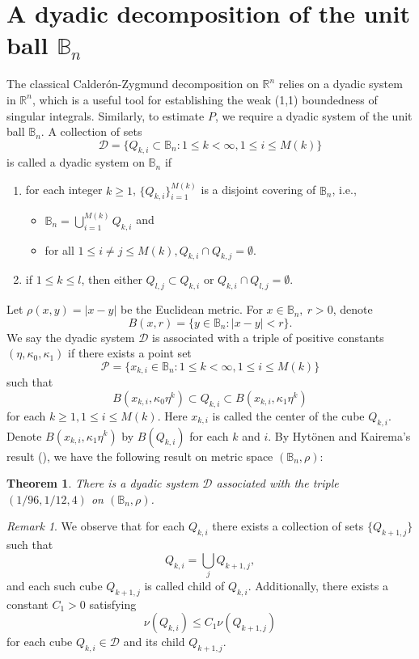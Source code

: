 \documentclass[12pt]{amsart}
\newtheorem{theorem}{Theorem}[section]
\theoremstyle{definition}
\theoremstyle{remark}
\newtheorem{remark}{Remark}[section]
\newcommand{\R}{\mathbb{R}}
\newcommand{\B}{\mathbb{B}}
\begin{document}
\section{A dyadic decomposition of the unit ball $\B_n$}
The classical Calder\'on-Zygmund decomposition on $\R^n$ relies on a dyadic system in $\R^n$, which is a useful tool for establishing the weak (1,1) boundedness of singular integrals. 
Similarly, to estimate $P$, we require a dyadic system of the unit ball $\B_n$. 
A collection of sets 
\[
	\mathscr{D}=\{Q_{k,i}\subset\B_n: 1\leqslant k<\infty,1\leqslant i\leqslant M(k)\}
\]
is called a dyadic system on $\B_n$ if 
\begin{enumerate}[{(i)}]
	\item 
	for each integer $k\geqslant 1$, $\{Q_{k,i}\}_{i=1}^{M(k)}$ is a disjoint covering of $\B_n$, i.e.,
	\begin{itemize}
		\item $\B_n=\bigcup\limits_{i=1}^{M(k)} Q_{k,i}$ and 
		\item for all $1\leqslant i\neq j\leqslant M(k), Q_{k,i}\cap Q_{k,j}=\emptyset $.
	\end{itemize}
	\item if $1\leqslant k\leqslant l$, then either $Q_{l,j}\subset Q_{k,i}$ or $Q_{k,i}\cap Q_{l,j}=\emptyset$.
\end{enumerate}

Let $\rho(x,y)=|x-y|$ be the Euclidean metric.
For $x\in\B_n,\ r>0$, denote
\[
	B(x,r)=\{y\in\B_n:|x-y|<r\}.
\]
We say the dyadic system $\mathscr{D}$ is associated with a triple of positive constants $(\eta,\kappa_0,\kappa_1)$ if there exists a point set 
\[
	\mathcal{P}=\{x_{k,i}\in\B_n:1\leqslant k<\infty,1\leqslant i\leqslant M(k)\}
\] 
such that 
\begin{equation*}
	B(x_{k,i},\kappa_0\eta^k)\subset Q_{k,i}\subset B(x_{k,i},\kappa_1\eta^k)
\end{equation*}
for each $k\geqslant 1, 1\leqslant i\leqslant M(k)$.
Here $x_{k,i}$ is called the center of the cube $Q_{k,i}$.
Denote $B(x_{k,i},\kappa_1\eta^k)$ by $B(Q_{k,i})$ for each $k$ and $i$.
By Hyt\"onen and Kairema's result (\cite[Theorem 4.1]{Hytonen2012}), we have the following result on metric space $(\B_n,\rho)$:
\begin{theorem}\label{dyadic-thm}
There is a dyadic system $\mathscr{D}$ associated with the triple $(1/96,1/12,4)$ on $(\B_n,\rho)$.
\end{theorem}
\begin{remark}\label{remark2.1}
	We observe that for each $Q_{k,i}$ there exists a collection of sets $\{Q_{k+1,j}\}$ such that 
	\[Q_{k,i}=\bigcup\limits_{j}Q_{k+1,j},\]
	and each such cube $Q_{k+1,j}$ is called child of $Q_{k,i}.$
	Additionally, there exists a constant $C_1>0$ satisfying 
	\[\nu(Q_{k,i})\leqslant C_1\nu(Q_{k+1,j})\]
	for each cube $Q_{k,i}\in\mathscr{D}$ and its child $Q_{k+1,j}$.
\end{remark}
\end{document}
